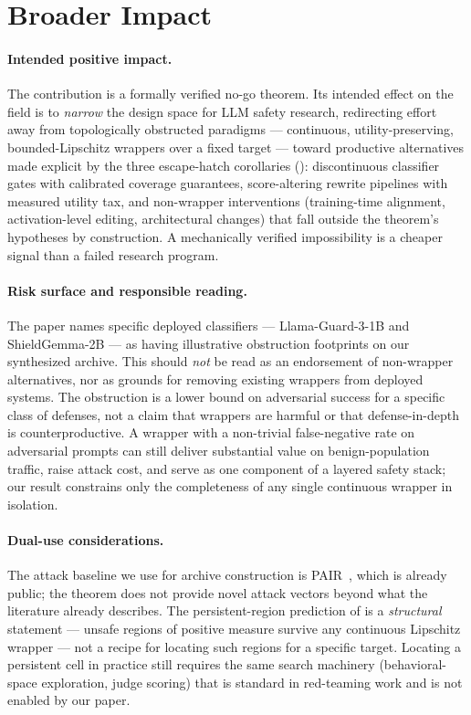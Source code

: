 \documentclass[11pt]{article}
\begin{document}
\section*{Broader Impact}

\paragraph{Intended positive impact.}
The contribution is a formally verified no-go theorem. Its intended
effect on the field is to \emph{narrow} the design space for LLM
safety research, redirecting effort away from topologically
obstructed paradigms --- continuous, utility-preserving,
bounded-Lipschitz wrappers over a fixed target --- toward productive
alternatives made explicit by the three escape-hatch corollaries
(): discontinuous classifier gates with
calibrated coverage guarantees, score-altering rewrite pipelines with
measured utility tax, and non-wrapper interventions (training-time
alignment, activation-level editing, architectural changes) that fall
outside the theorem's hypotheses by construction. A mechanically
verified impossibility is a cheaper signal than a failed research
program.

\paragraph{Risk surface and responsible reading.}
The paper names specific deployed classifiers --- Llama-Guard-3-1B and
ShieldGemma-2B --- as having illustrative obstruction footprints on
our synthesized archive. This should \emph{not} be read as an
endorsement of non-wrapper alternatives, nor as grounds for removing
existing wrappers from deployed systems. The obstruction is a lower
bound on adversarial success for a specific class of defenses, not a
claim that wrappers are harmful or that defense-in-depth is
counterproductive. A wrapper with a non-trivial false-negative rate
on adversarial prompts can still deliver substantial value on
benign-population traffic, raise attack cost, and serve as one
component of a layered safety stack; our result constrains only the
completeness of any single continuous wrapper in isolation.

\paragraph{Dual-use considerations.}
The attack baseline we use for archive construction is
PAIR~\cite{chao2024jailbreaking}, which is already public; the
theorem does not provide novel attack vectors beyond what the
literature already describes. The persistent-region prediction of
 is a \emph{structural} statement --- unsafe
regions of positive measure survive any continuous Lipschitz wrapper
--- not a recipe for locating such regions for a specific target.
Locating a persistent cell in practice still requires the same
search machinery (behavioral-space exploration, judge scoring) that
is standard in red-teaming work and is not enabled by our paper.
\end{document}
